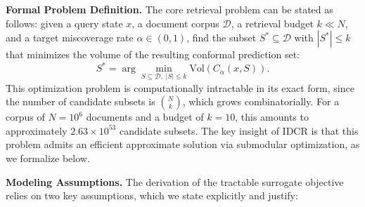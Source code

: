 \documentclass[12pt,a4paper,oneside]{report}
\theoremstyle{definition}
\theoremstyle{remark}
\begin{document}
\medskip
\noindent\textbf{Formal Problem Definition.}
The core retrieval problem can be stated as follows: given a query state $x$, a document corpus $\mathcal{D}$, a retrieval budget $k \ll N$, and a target miscoverage rate $\alpha \in (0,1)$, find the subset $S^* \subseteq \mathcal{D}$ with $|S^*| \leq k$ that minimizes the volume of the resulting conformal prediction set:
\[
S^* = \arg\min_{S \subseteq \mathcal{D},\; |S| \leq k} \text{Vol}\left(C_{\alpha}(x, S)\right).
\]
This optimization problem is computationally intractable in its exact form, since the number of candidate subsets is $\binom{N}{k}$, which grows combinatorially. For a corpus of $N = 10^6$ documents and a budget of $k = 10$, this amounts to approximately $2.63 \times 10^{53}$ candidate subsets. The key insight of IDCR is that this problem admits an efficient approximate solution via submodular optimization, as we formalize below.

\medskip
\noindent\textbf{Modeling Assumptions.}
The derivation of the tractable surrogate objective relies on two key assumptions, which we state explicitly and justify:
\end{document}
